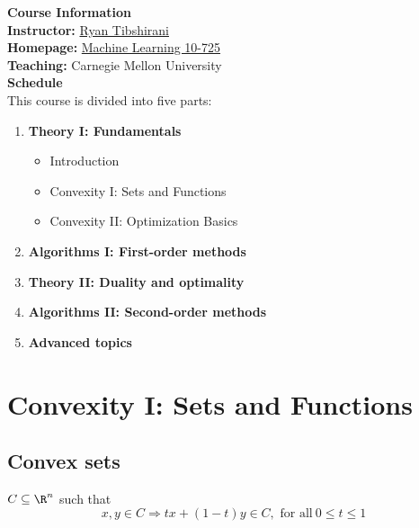 \documentclass[a4paper]{article}
\def\nlecturer {Ryan Tibshirani}
\begin{document}
\maketitle
{\small
\noindent\textbf{Course Information}\\ 
\indent \textbf{Instructor:} \textcolor{blue}{\href{https://www.stat.berkeley.edu/~ryantibs/index.html}{\nlecturer}} \\
\indent\textbf{Homepage:} \textcolor{blue}{\href{https://www.stat.cmu.edu/~ryantibs/convexopt/}{Machine Learning 10-725}} \\
\indent\textbf{Teaching:} Carnegie Mellon University \\

\vspace{10pt}
\noindent\textbf{Schedule}\\
\indent This course is divided into five parts: 
\begin{enumerate}
    \item \textbf{Theory I: Fundamentals}
    \begin{itemize}
        \item Introduction
        \item Convexity I: Sets and Functions
        \item Convexity II: Optimization Basics
    \end{itemize}
    \item \textbf{Algorithms I: First-order methods}
    \item \textbf{Theory II: Duality and optimality}
    \item \textbf{Algorithms II: Second-order methods}
    \item \textbf{Advanced topics}
\end{enumerate}

\tableofcontents


\section{Convexity I: Sets and Functions}
\subsection{Convex sets}
\begin{defi}
  $C \subseteq \R^n$ such that 
  \[
      x, y \in C \Longrightarrow  tx + (1-t)y \in C,\text{\ for\ all}\ 0 \leq t \leq 1 
  \]
\end{defi}

}
\end{document}
